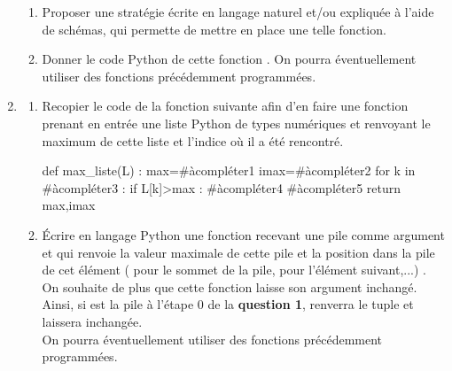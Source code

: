 \documentclass[11pt,a4paper,french,twoside]{PMCours}
\begin{document}
\begin{enumerate}
\begin{enumerate}
    \item Proposer une stratégie écrite en langage naturel et/ou expliquée à l'aide de
    schémas, qui permette de mettre en place une telle fonction.
    \item Donner le code Python de cette fonction . On pourra éventuellement utiliser des fonctions précédemment programmées.
\end{enumerate}

    \item \begin{enumerate}
    \item Recopier le code de la fonction suivante afin d'en faire une fonction prenant en entrée une liste Python  de types numériques et renvoyant le maximum de cette liste et l'indice où il a été rencontré.
\begin{Python}
def max_liste(L) : 
	max=#àcompléter1
	imax=#àcompléter2
	for k in #àcompléter3 :
		if L[k]>max : 
			#àcompléter4
			#àcompléter5
	return max,imax
\end{Python}
    \item Écrire en langage Python une fonction  recevant une pile  comme argument et qui renvoie la valeur maximale de cette pile et la position dans la pile de cet élément ( pour le sommet de la pile,  pour l'élément suivant,...) . \\
    On souhaite de plus que cette fonction laisse son argument  inchangé.\\
Ainsi, si  est la pile à l'étape 0 de la {\bf question 1},  renverra le tuple  et laissera  inchangée. \\   
On pourra éventuellement utiliser des fonctions précédemment programmées.
\end{enumerate}
\end{enumerate}
    
    
\end{document}
